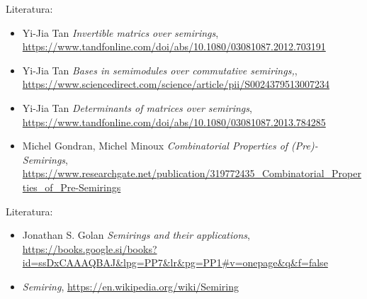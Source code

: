 \documentclass[t, 12pt]{beamer} %
\begin{document}
\begin{frame}{Literatura:}
	\begin{itemize}
		\item Yi-Jia Tan {\em Invertible matrics over semirings}, \url{https://www.tandfonline.com/doi/abs/10.1080/03081087.2012.703191}
%		
		\item Yi-Jia Tan {\em Bases in semimodules over commutative semirings,},	\url{https://www.sciencedirect.com/science/article/pii/S0024379513007234}
		
		\item Yi-Jia Tan {\em Determinants of matrices over semirings}, \url{https://www.tandfonline.com/doi/abs/10.1080/03081087.2013.784285}
		
		\item Michel Gondran, Michel Minoux {\em Combinatorial Properties of (Pre)-Semirings}, \url{https://www.researchgate.net/publication/319772435_Combinatorial_Properties_of_Pre-Semirings}
	\end{itemize}
\end{frame}

\begin{frame}{Literatura:}
	\begin{itemize}
		\item Jonathan S. Golan {\em Semirings and their applications}, \url{https://books.google.si/books?id=ssDxCAAAQBAJ&lpg=PP7&lr&pg=PP1#v=onepage&q&f=false}
%
		\item {\em Semiring}, \url{https://en.wikipedia.org/wiki/Semiring}			
	\end{itemize}
\end{frame}
\end{document}
